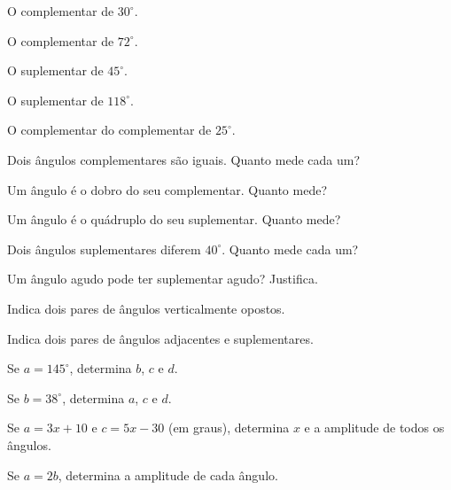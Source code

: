 \documentclass[12pt]{article}
\begin{document}
\begin{exercicios}
  \item O complementar de $30^\circ$.
  \item O complementar de $72^\circ$.
  \item O suplementar de $45^\circ$.
  \item O suplementar de $118^\circ$.
  \item O complementar do complementar de $25^\circ$.
  \item Dois ângulos complementares são iguais. Quanto mede cada um?
  \item Um ângulo é o dobro do seu complementar. Quanto mede?
  \item Um ângulo é o quádruplo do seu suplementar. Quanto mede?
  \item Dois ângulos suplementares diferem $40^\circ$. Quanto mede cada um?
  \item Um ângulo agudo pode ter suplementar agudo? Justifica.
\end{exercicios}


\begin{center}
\end{center}

\begin{exercicios}
  \item Indica dois pares de ângulos verticalmente opostos.
  \item Indica dois pares de ângulos adjacentes e suplementares.
  \item Se $a = 145^\circ$, determina $b$, $c$ e $d$.
  \item Se $b = 38^\circ$, determina $a$, $c$ e $d$.
  \item Se $a = 3x + 10$ e $c = 5x - 30$ (em graus), determina $x$ e a amplitude de todos os ângulos.
  \item Se $a = 2b$, determina a amplitude de cada ângulo.
\end{exercicios}
\end{document}
